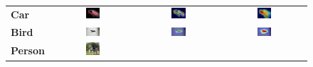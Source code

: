 \begin{figure}[H]
\begin{tcolorbox}[colframe=black!60, colback=white, boxrule=0.8pt, arc=2pt, left=2pt, right=2pt, top=2pt, bottom=2pt]
\begin{tabular}{m{2.5cm} c c c}
    \\
    \textbf{Car}
    & \includegraphics[width=0.18\textwidth,height=0.18\textwidth]{figures/originals/2007_006277}
    & \includegraphics[width=0.18\textwidth,height=0.18\textwidth]{figures/test_cams/weclip/2007_006277_6}
    & \includegraphics[width=0.18\textwidth,height=0.18\textwidth]{figures/test_cams/ours/2007_006277_6}
    \\
    \textbf{Bird}
    & \includegraphics[width=0.18\textwidth,height=0.18\textwidth]{figures/originals/2007_001289}
    & \includegraphics[width=0.18\textwidth,height=0.18\textwidth]{figures/test_cams/weclip/2007_001289_2}
    & \includegraphics[width=0.18\textwidth,height=0.18\textwidth]{figures/test_cams/ours/2007_001289_2}
    \\
    \textbf{Person}
    & \includegraphics[width=0.18\textwidth,height=0.18\textwidth]{figures/originals/2007_000783}

\end{tabular}
\end{tcolorbox}
\end{figure}
